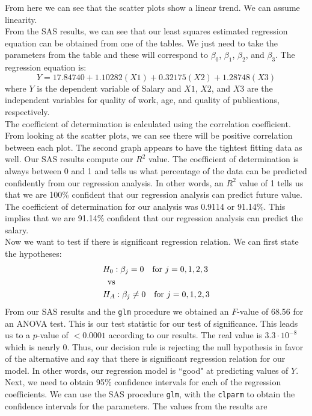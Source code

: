 \documentclass[oneside,10pt]{article}
\begin{document}
\begin{adjustwidth}{2.5em}{0pt}
\begin{center}
			\end{center}
			From here we can see that the scatter plots show a linear trend. We can assume linearity.\\[1mm]
			From the SAS results, we can see that our least squares estimated regression equation can be obtained from one of the tables. We just need to take the parameters from the table and these will correspond to $\beta_0$, $\beta_1$, $\beta_2$, and $\beta_3$. The regression equation is: $$Y=17.84740+1.10282(X1)+0.32175(X2)+1.28748(X3)$$ where $Y$ is the dependent variable of Salary and $X1$, $X2$, and $X3$ are the  independent variables for quality of work, age, and quality of publications, respectively.\\[1mm]
			The coefficient of determination is calculated using the correlation coefficient. From looking at the scatter plots, we can see there will be positive correlation between each plot. The second graph appears to have the tightest fitting data as well. Our SAS results compute our $R^2$ value. The coefficient of determination is always between 0 and 1 and tells us what percentage of the data can be predicted confidently from our regression analysis. In other words, an $R^2$ value of 1 tells us that we are 100\% confident that our regression analysis can predict future value. The coefficient of determination for our analysis was 0.9114 or 91.14\%. This implies that we are 91.14\% confident that our regression analysis can predict the salary.\\[1mm]
			Now we want to test if there is significant regression relation. We can first state the hypotheses:
				\begin{align*}
					&H_0: \beta_j=0 \quad \text{for }j=0,1,2,3\\
					& \hspace{2mm}\text{vs}\\
					&H_A: \beta_j \neq 0 \quad \text{for }j=0,1,2,3
				\end{align*}
			From our SAS results and the \texttt{glm} procedure we obtained an $F$-value of 68.56 for an ANOVA test. This is our test statistic for our test of significance. This leads us to a $p$-value of $<0.0001$ according to our results. The real value is $3.3\cdot 10^{-8}$ which is nearly 0. Thus, our decision rule is rejecting the null hypothesis in favor of the alternative and say that there is significant regression relation for our model. In other words, our regression model is ``good" at predicting values of $Y$.\\[1mm]
			Next, we need to obtain 95\% confidence intervals for each of the regression coefficients. We can use the SAS procedure \texttt{glm}, with the \texttt{clparm} to obtain the confidence intervals for the parameters. The values from the results are

\end{adjustwidth}
\end{document}

